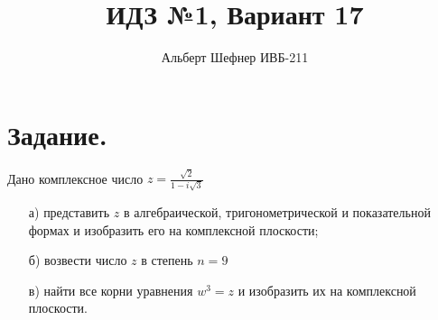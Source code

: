 \documentclass[12pt, a4paper]{article}
\title{ИДЗ №1, Вариант 17}
\author{Альберт Шефнер ИВБ-211}
\begin{document}
\maketitle 
\tableofcontents
\newpage
%
%
\section{Задание.}
    Дано комплексное число
    \begin{math}
        z = \frac{\sqrt{2}}{1 - i\sqrt{3}}
    \end{math}
    \begin{enumerate}
        \item [а)] представить 
        \begin{math}
            z
        \end{math}
        в алгебраической, тригонометрической и показательной 
        формах и изобразить его на комплексной плоскости;
        \item [б)] возвести число $z$ в степень $n = 9$
        \item [в)] найти все корни уравнения
        \begin{math}
            w^3 = z
        \end{math}
        и изобразить их на комплексной плоскости.
    \end{enumerate}
\end{document}
